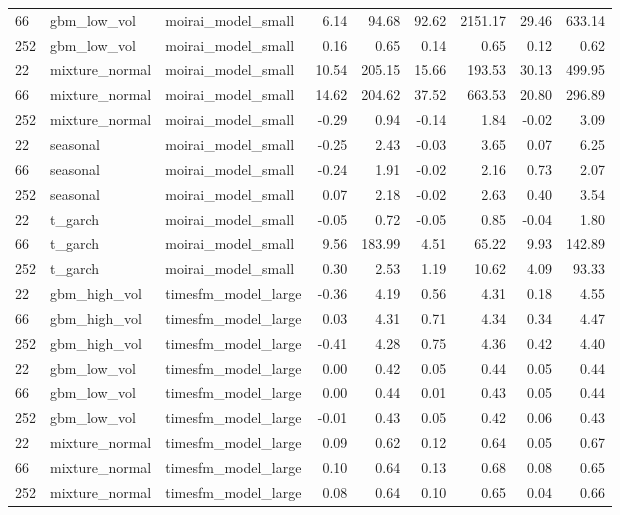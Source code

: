 {\begin{tabular}{lllrrrrrr}
66 & gbm\_low\_vol & moirai\_model\_small & 6.14 & 94.68 & 92.62 & 2151.17 & 29.46 & 633.14 \\
252 & gbm\_low\_vol & moirai\_model\_small & 0.16 & 0.65 & 0.14 & 0.65 & 0.12 & 0.62 \\
\midrule
22 & mixture\_normal & moirai\_model\_small & 10.54 & 205.15 & 15.66 & 193.53 & 30.13 & 499.95 \\
66 & mixture\_normal & moirai\_model\_small & 14.62 & 204.62 & 37.52 & 663.53 & 20.80 & 296.89 \\
252 & mixture\_normal & moirai\_model\_small & -0.29 & 0.94 & -0.14 & 1.84 & -0.02 & 3.09 \\
\midrule
22 & seasonal & moirai\_model\_small & -0.25 & 2.43 & -0.03 & 3.65 & 0.07 & 6.25 \\
66 & seasonal & moirai\_model\_small & -0.24 & 1.91 & -0.02 & 2.16 & 0.73 & 2.07 \\
252 & seasonal & moirai\_model\_small & 0.07 & 2.18 & -0.02 & 2.63 & 0.40 & 3.54 \\
\midrule
22 & t\_garch & moirai\_model\_small & -0.05 & 0.72 & -0.05 & 0.85 & -0.04 & 1.80 \\
66 & t\_garch & moirai\_model\_small & 9.56 & 183.99 & 4.51 & 65.22 & 9.93 & 142.89 \\
252 & t\_garch & moirai\_model\_small & 0.30 & 2.53 & 1.19 & 10.62 & 4.09 & 93.33 \\
\midrule
22 & gbm\_high\_vol & timesfm\_model\_large & -0.36 & 4.19 & 0.56 & 4.31 & 0.18 & 4.55 \\
66 & gbm\_high\_vol & timesfm\_model\_large & 0.03 & 4.31 & 0.71 & 4.34 & 0.34 & 4.47 \\
252 & gbm\_high\_vol & timesfm\_model\_large & -0.41 & 4.28 & 0.75 & 4.36 & 0.42 & 4.40 \\
\midrule
22 & gbm\_low\_vol & timesfm\_model\_large & 0.00 & 0.42 & 0.05 & 0.44 & 0.05 & 0.44 \\
66 & gbm\_low\_vol & timesfm\_model\_large & 0.00 & 0.44 & 0.01 & 0.43 & 0.05 & 0.44 \\
252 & gbm\_low\_vol & timesfm\_model\_large & -0.01 & 0.43 & 0.05 & 0.42 & 0.06 & 0.43 \\
\midrule
22 & mixture\_normal & timesfm\_model\_large & 0.09 & 0.62 & 0.12 & 0.64 & 0.05 & 0.67 \\
66 & mixture\_normal & timesfm\_model\_large & 0.10 & 0.64 & 0.13 & 0.68 & 0.08 & 0.65 \\
252 & mixture\_normal & timesfm\_model\_large & 0.08 & 0.64 & 0.10 & 0.65 & 0.04 & 0.66 \\

\end{tabular}}
